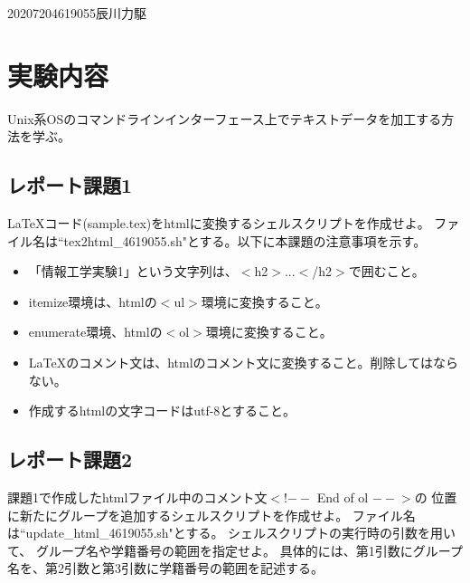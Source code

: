\documentclass[12pt]{jarticle}
\begin{document}
{2020}{7}{20}{4619055}{辰川力駆}


\section{実験内容}
Unix系OSのコマンドラインインターフェース上でテキストデータを加工する方法を学ぶ。
\subsection{レポート課題1}
\begin{shadebox}
    \LaTeX コード(sample.tex)をhtmlに変換するシェルスクリプトを作成せよ。
    ファイル名は``tex2html\_4619055.sh"とする。以下に本課題の注意事項を示す。
    \begin{itemize}
        \item 「情報工学実験1」という文字列は、$<$h2$>$...$<$/h2$>$で囲むこと。
        \item itemize環境は、htmlの$<$ul$>$環境に変換すること。
        \item enumerate環境、htmlの$<$ol$>$環境に変換すること。
        \item \LaTeX のコメント文は、htmlのコメント文に変換すること。削除してはならない。
        \item 作成するhtmlの文字コードはutf-8とすること。
    \end{itemize}
\end{shadebox}

\subsection{レポート課題2}
\begin{shadebox}
    課題1で作成したhtmlファイル中のコメント文$<$!$--$ End of ol $--$$>$の
    位置に新たにグループを追加するシェルスクリプトを作成せよ。
    ファイル名は``update\_html\_4619055.sh"とする。
    シェルスクリプトの実行時の引数を用いて、
    グループ名や学籍番号の範囲を指定せよ。
    具体的には、第1引数にグループ名を、第2引数と第3引数に学籍番号の範囲を記述する。
\end{shadebox}
\end{document}
